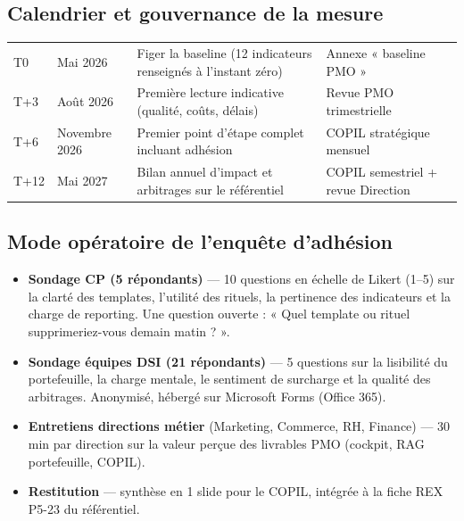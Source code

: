 \documentclass[11pt,a4paper,oneside]{report}
\begin{document}
\subsection*{Calendrier et gouvernance de la mesure}

\begin{center}
\renewcommand{\arraystretch}{1.4}
\begin{tabularx}{\textwidth}{C{2.2cm} C{2.4cm} L{4.5cm} Y}
\toprule
{}
 &  &  &  \\
\midrule
T0 & Mai 2026 & Figer la baseline (12 indicateurs renseignés à l'instant zéro) & Annexe « baseline PMO » \\
T+3 & Août 2026 & Première lecture indicative (qualité, coûts, délais) & Revue PMO trimestrielle \\
T+6 & Novembre 2026 & Premier point d'étape complet incluant adhésion & COPIL stratégique mensuel \\
T+12 & Mai 2027 & Bilan annuel d'impact et arbitrages sur le référentiel & COPIL semestriel + revue Direction \\
\bottomrule
\end{tabularx}
\end{center}

\subsection*{Mode opératoire de l'enquête d'adhésion}

\begin{itemize}
  \item \textbf{Sondage CP (5 répondants)} --- 10 questions en échelle de Likert (1--5) sur la clarté des templates, l'utilité des rituels, la pertinence des indicateurs et la charge de reporting. Une question ouverte : « Quel template ou rituel supprimeriez-vous demain matin ? ».
  \item \textbf{Sondage équipes DSI (21 répondants)} --- 5 questions sur la lisibilité du portefeuille, la charge mentale, le sentiment de surcharge et la qualité des arbitrages. Anonymisé, hébergé sur Microsoft Forms (Office 365).
  \item \textbf{Entretiens directions métier} (Marketing, Commerce, RH, Finance) --- 30 min par direction sur la valeur perçue des livrables PMO (cockpit, RAG portefeuille, COPIL).
  \item \textbf{Restitution} --- synthèse en 1 slide pour le COPIL, intégrée à la fiche REX P5-23 du référentiel.
\end{itemize}
\end{document}
